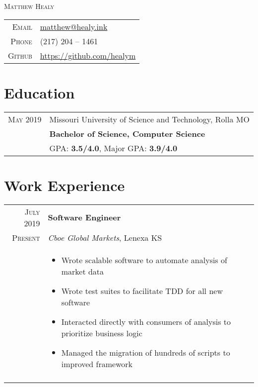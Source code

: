 \documentclass[a4paper,10pt]{article}
\newcommand{\br}{\\\multicolumn{2}{c}{}}
\begin{document}
\pagestyle{empty}

\par{\centering
    {\Huge \textsc{Matthew Healy}
}\bigskip\par}

\begin{center}
\begin{tabular}{rl}
    \textsc{Email } & \href{mailto:matthew@healy.ink}{matthew@healy.ink} \\
    \textsc{Phone }        & (217) 204 -- 1461  \\
    \textsc{Github }       & \url{https://github.com/healym} \\
\end{tabular}
\end{center}

\section{Education}
\begin{tabular}{r|p{15cm}}
    \textsc{May} 2019 & Missouri University of Science and Technology, Rolla MO  \\
                      & \textbf{Bachelor of Science, Computer Science} \\
                      & GPA: \textbf{3.5/4.0}, Major GPA: \textbf{3.9/4.0} \\
\end{tabular}


\section{Work Experience}

\begin{tabular}{r|p{15cm}}
    \textsc{July 2019} & \textbf{Software Engineer} \\
    \textsc{Present}  & \textit{Cboe Global Markets}, Lenexa KS \\ &
    \begin{itemize}
    \item Wrote scalable software to automate analysis of market data
    \item Wrote test suites to facilitate TDD for all new software
    \item Interacted directly with consumers of analysis to prioritize business logic
    \item Managed the migration of hundreds of scripts to improved framework

    \end{itemize} \br\\

\end{tabular}
\end{document}
